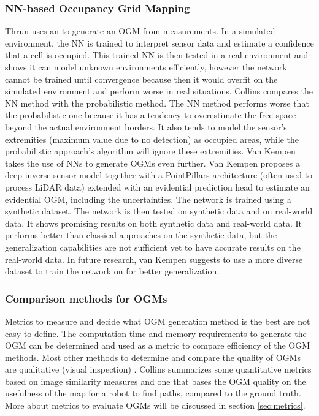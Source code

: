 \subsubsection{\gls{NN}-based Occupancy Grid Mapping}
Thrun \cite{thrun1993exploration} uses an  to generate an \gls{OGM} from measurements. In a simulated environment, the \gls{NN} is trained to interpret sensor data and estimate a confidence that a cell is occupied. This trained \gls{NN} is then tested in a real environment and shows it can model unknown environments efficiently, however the network cannot be trained until convergence because then it would overfit on the simulated environment and perform worse in real situations. Collins \cite{collins2007occupancy} compares the \gls{NN} method with the probabilistic method. The \gls{NN} method performs worse that the probabilistic one because it has a tendency to overestimate the free space beyond the actual environment borders. It also tends to model the sensor's extremities (maximum value due to no detection) as occupied areas, while the probabilistic approach's algorithm will ignore these extremities. Van Kempen \cite{van2021simulation} takes the use of \glspl{NN} to generate OGMs even further. Van Kempen proposes a deep inverse sensor model together with a PointPillars architecture (often used to process LiDAR data) extended with an evidential prediction head to estimate an evidential \gls{OGM}, including the uncertainties. The network is trained using a synthetic dataset. The network is then tested on synthetic data and on real-world data. It shows promising results on both synthetic data and real-world data. It performs better than classical approaches on the synthetic data, but the generalization capabilities are not sufficient yet to have accurate results on the real-world data. In future research, van Kempen suggests to use a more diverse dataset to train the network on for better generalization. 

\subsubsection{Comparison methods for \glspl{OGM}}
Metrics to measure and decide what \gls{OGM} generation method is the best are not easy to define. The computation time and memory requirements to generate the \gls{OGM} can be determined and used as a metric to compare efficiency of the \gls{OGM} methods. Most other methods to determine and compare the quality of \glspl{OGM} are qualitative (visual inspection) \cite{ribo2001comparison}. Collins \cite{collins2007occupancy} summarizes some quantitative metrics based on image similarity measures and one that bases the \gls{OGM} quality on the usefulness of the map for a robot to find paths, compared to the ground truth. More about metrics to evaluate \glspl{OGM} will be discussed in section \ref{sec:metrics}. \\

